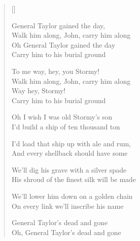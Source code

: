 \pagebreak
\settowidth{\versewidth}{We'll dig his grave with a silver spade}
\begin{verse}[\versewidth]
\begin{patverse}
General Taylor gained the day,\\
Walk him along, John, carry him along\\
Oh General Taylor gained the day\\
Carry him to his burial ground
\end{patverse}

\begin{patverse}
\begin{chorus}
To me way, hey, you Stormy!\\
Walk him along, John, carry him along\\
Way hey, Stormy!\\
Carry him to his burial ground
\end{chorus}
\end{patverse}

Oh I wish I was old Stormy's son\\
I'd build a ship of ten thousand ton

I'd load that ship up with ale and rum,\\
And every shellback should have some

We'll dig his grave with a silver spade\\
His shroud of the finest silk will be made

We'll lower him down on a golden chain\\
On every link we'll inscribe his name

General Taylor's dead and gone\\
Oh, General Taylor's dead and gone

\end{verse}

